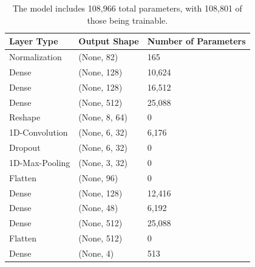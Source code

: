 \bgroup
\def\arraystretch{1.5}%
\begin{table}[h!]
    \centering
    \begin{tabular}{|l|l|l|}
    \hline
    Layer  Type    & Output Shape  & Number of Parameters \\ \hline
    Normalization  & (None, 82)    & 165                  \\ \hline
    Dense          & (None, 128)   & 10,624               \\ \hline
    Dense          & (None, 128)   & 16,512               \\ \hline
    Dense          & (None, 512)   & 25,088               \\ \hline
    Reshape        & (None, 8, 64) & 0                    \\ \hline
    1D-Convolution & (None, 6, 32) & 6,176                \\ \hline
    Dropout        & (None, 6, 32) & 0                    \\ \hline
    1D-Max-Pooling & (None, 3, 32) & 0                    \\ \hline
    Flatten        & (None, 96)    & 0                    \\ \hline
    Dense          & (None, 128)   & 12,416               \\ \hline
    Dense          & (None, 48)    & 6,192                \\ \hline
    Dense          & (None, 512)   & 25,088               \\ \hline
    Flatten        & (None, 512)   & 0                    \\ \hline
    Dense          & (None, 4)     & 513                  \\ \hline
    \end{tabular}
    \caption[NN-Architecture Optimized for Simulations]{The model includes 108,966 total parameters, with 108,801 of those being trainable.}
    \label{tb:nn-arch-sims}
\end{table}
\egroup


